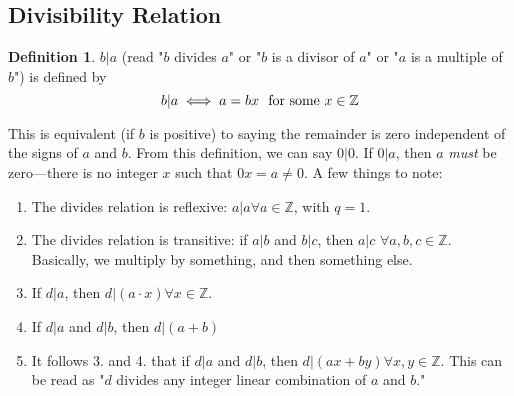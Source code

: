 \documentclass[10pt]{article}
\newcommand\ZZ{{\mathbb Z}}
\theoremstyle{definition}
\newtheorem{definition}{Definition}[section]
\begin{document}
\subsection{Divisibility Relation}
\begin{definition}
$b|a$ (read "$b$ divides $a$" or "$b$ is a divisor of $a$" or "$a$ is a multiple of $b$") is defined by 
\[b|a \iff a = bx ~\textnormal{ for some $x\in \ZZ$}
\]
\end{definition}
This is equivalent (if $b$ is positive) to saying the remainder is zero independent of the signs of $a$ and $b$.  From this definition, we can say $0|0$.  If $0|a$, then $a$ \textit{must} be zero---there is no integer $x$ such that $0x=a\neq 0$.  A few things to note: 
\begin{enumerate}
\item The divides relation is reflexive: $a|a \forall a \in\ZZ$, with $q=1$.  
\item The divides relation is transitive: if $a|b$ and $b|c$, then $a|c$ $\forall a,b,c\in\ZZ$. Basically, we multiply by something, and then something else.  
\item If $d|a$, then $d|(a\cdot x) \forall x\in\ZZ$.  
\item If $d|a$ and $d|b$, then $d|(a+b)$
\item It follows 3. and 4. that if $d|a$ and $d|b$, then $d|(ax+by)\forall x,y\in\ZZ$.  This can be read as "$d$ divides any integer linear combination of $a$ and $b$."
\end{enumerate}
\end{document}
